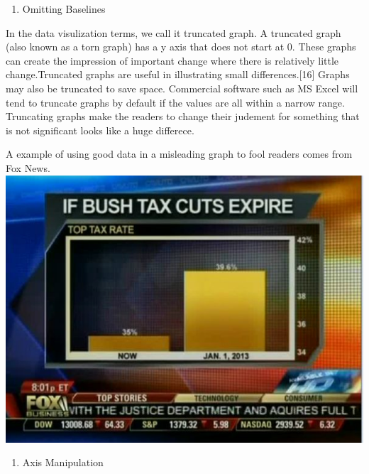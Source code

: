 \documentclass[]{book}
\providecommand{\tightlist}{%
  \setlength{\itemsep}{0pt}\setlength{\parskip}{0pt}}
\theoremstyle{definition}
\theoremstyle{definition}
\theoremstyle{definition}
\theoremstyle{remark}
\begin{document}
\begin{enumerate}
\def\labelenumi{\arabic{enumi}.}
\tightlist
\item
  Omitting Baselines
\end{enumerate}

In the data visulization terms, we call it truncated graph. A truncated
graph (also known as a torn graph) has a y axis that does not start at
0. These graphs can create the impression of important change where
there is relatively little change.Truncated graphs are useful in
illustrating small differences.{[}16{]} Graphs may also be truncated to
save space. Commercial software such as MS Excel will tend to truncate
graphs by default if the values are all within a narrow range.
Truncating graphs make the readers to change their judement for
something that is not significant looks like a huge differece.

A example of using good data in a misleading graph to fool readers comes
from Fox News. \includegraphics{images/1.png}

\begin{enumerate}
\def\labelenumi{\arabic{enumi}.}
\setcounter{enumi}{1}
\tightlist
\item
  Axis Manipulation
\end{enumerate}
\end{document}

